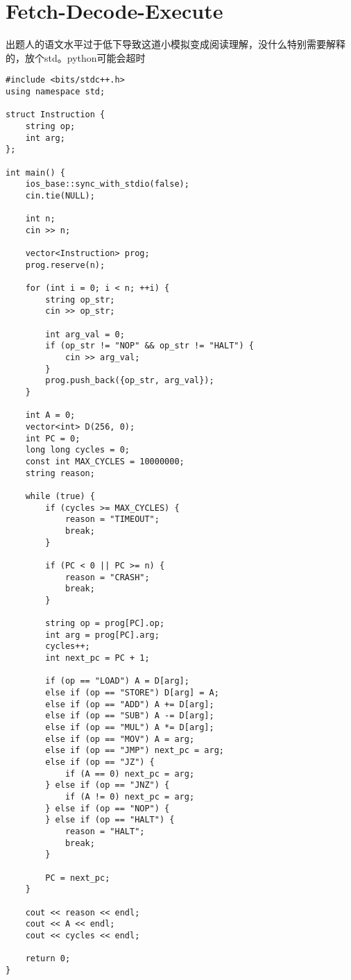 \documentclass[14pt,a4paper]{article}
\begin{document}
\section{Fetch-Decode-Execute}
出题人的语文水平过于低下导致这道小模拟变成阅读理解，没什么特别需要解释的，放个std。python可能会超时
\begin{verbatim}
#include <bits/stdc++.h>
using namespace std;

struct Instruction {
    string op;
    int arg;
};

int main() {
    ios_base::sync_with_stdio(false);
    cin.tie(NULL);

    int n;
    cin >> n;

    vector<Instruction> prog;
    prog.reserve(n);

    for (int i = 0; i < n; ++i) {
        string op_str;
        cin >> op_str;

        int arg_val = 0;
        if (op_str != "NOP" && op_str != "HALT") {
            cin >> arg_val;
        }
        prog.push_back({op_str, arg_val});
    }

    int A = 0;
    vector<int> D(256, 0);
    int PC = 0;
    long long cycles = 0;
    const int MAX_CYCLES = 10000000;
    string reason;

    while (true) {
        if (cycles >= MAX_CYCLES) {
            reason = "TIMEOUT";
            break;
        }

        if (PC < 0 || PC >= n) {
            reason = "CRASH";
            break;
        }

        string op = prog[PC].op;
        int arg = prog[PC].arg;
        cycles++;
        int next_pc = PC + 1;

        if (op == "LOAD") A = D[arg];
        else if (op == "STORE") D[arg] = A;
        else if (op == "ADD") A += D[arg];
        else if (op == "SUB") A -= D[arg];
        else if (op == "MUL") A *= D[arg];
        else if (op == "MOV") A = arg;
        else if (op == "JMP") next_pc = arg;
        else if (op == "JZ") {
            if (A == 0) next_pc = arg;
        } else if (op == "JNZ") {
            if (A != 0) next_pc = arg;
        } else if (op == "NOP") {
        } else if (op == "HALT") {
            reason = "HALT";
            break;
        }

        PC = next_pc;
    }

    cout << reason << endl;
    cout << A << endl;
    cout << cycles << endl;

    return 0;
}
\end{verbatim}
\end{document}
